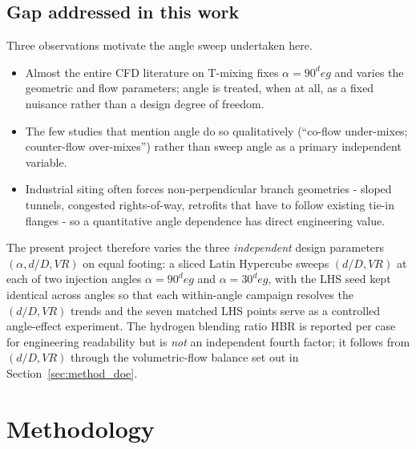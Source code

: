 \documentclass[11pt,a4paper]{article}
\def\dD{d/D}%
\def\VR{VR}%
\def\HBR{HBR}%
\def\circ{ deg}%
\newcommand{\dD}{\ensuremath{d/D}}
\newcommand{\VR}{\ensuremath{\mathrm{VR}}}
\newcommand{\HBR}{\ensuremath{\mathrm{HBR}}}
\begin{document}
\subsection{Gap addressed in this work}
Three observations motivate the angle sweep undertaken here.
\begin{itemize}
    \item Almost the entire CFD literature on T-mixing fixes
    \(\alpha = 90^\circ\) and varies the geometric and flow
    parameters; angle is treated, when at all, as a fixed nuisance
    rather than a design degree of freedom.
    \item The few studies that mention angle do so qualitatively
    (``co-flow under-mixes; counter-flow over-mixes'') rather than
    sweep angle as a primary independent variable.
    \item Industrial siting often forces non-perpendicular branch
    geometries - sloped tunnels, congested rights-of-way, retrofits
    that have to follow existing tie-in flanges - so a quantitative
    angle dependence has direct engineering value.
\end{itemize}
The present project therefore varies the three \emph{independent}
design parameters \((\alpha,\dD,\VR)\) on equal footing: a sliced
Latin Hypercube sweeps \((\dD,\VR)\) at each of two injection
angles \(\alpha = 90^\circ\) and \(\alpha = 30^\circ\), with the
LHS seed kept identical across angles so that each within-angle
campaign resolves the \((\dD,\VR)\) trends and the seven matched
LHS points serve as a controlled angle-effect experiment. The
hydrogen blending ratio \HBR{} is reported per case for
engineering readability but is \emph{not} an independent fourth
factor; it follows from \((\dD,\VR)\) through the volumetric-flow
balance set out in Section~\ref{sec:method_doe}.

\section{Methodology}
\label{sec:method}
\end{document}
